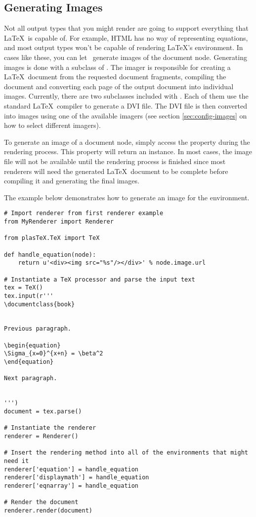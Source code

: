 \subsection{Generating Images}

Not all output types that you might render are going to support everything
that \LaTeX\ is capable of.  For example, HTML has no way of representing
equations, and most output types won't be capable of rendering
\LaTeX's  environment.  In cases like these, you
can let \plasTeX\ generate images of the document node.  Generating
images is done with a subclass of .
The imager is responsible for creating a \LaTeX\ document from the
requested document fragments, compiling the document and converting
each page of the output document into individual images.  Currently,
there are two  subclasses included with \plasTeX.
Each of them use the standard \LaTeX\ compiler to generate a DVI file.
The DVI file is then converted into images using one of the available
imagers (see section \ref{sec:config-images} on how to select different imagers).

To generate an image of a document node, simply access the 
property during the rendering process.  This property will return
an  instance.  In most cases, the image
file will not be available until the rendering process is finished
since most renderers will need the generated \LaTeX\ document to be
complete before compiling it and generating the final images.

The example below demonstrates how to generate an image for the
 environment.
\begin{verbatim}
# Import renderer from first renderer example
from MyRenderer import Renderer

from plasTeX.TeX import TeX

def handle_equation(node):
    return u'<div><img src="%s"/></div>' % node.image.url

# Instantiate a TeX processor and parse the input text
tex = TeX()
tex.input(r'''
\documentclass{book}


Previous paragraph.

\begin{equation}
\Sigma_{x=0}^{x+n} = \beta^2
\end{equation}

Next paragraph.


''')
document = tex.parse()

# Instantiate the renderer
renderer = Renderer()

# Insert the rendering method into all of the environments that might need it
renderer['equation'] = handle_equation
renderer['displaymath'] = handle_equation
renderer['eqnarray'] = handle_equation

# Render the document
renderer.render(document)
\end{verbatim}

